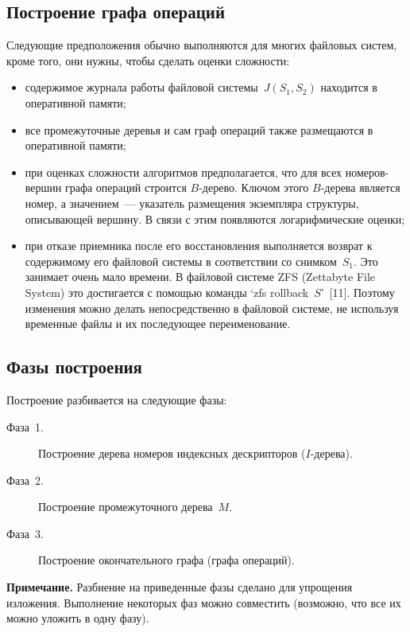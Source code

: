 \begin{multicols}{2}
\section{Построение графа операций}
\vspace*{-1pt}

      Следующие предположения обычно выполняются для многих файловых 
систем, кроме того, они нужны, чтобы сделать оценки сложности:  
      \begin{itemize}
\item содержимое журнала работы файловой системы~$J(S_1, S_2)$ 
находится в оперативной памяти;\\[-15pt]
\item все промежуточные деревья и сам граф операций также размещаются в 
оперативной памяти;\\[-15pt]
\item при оценках сложности алгоритмов предполагается, что для всех 
номеров-вершин графа операций строится $B$-дерево. Ключом этого 
$B$-дерева является номер, а значением~--- указатель размещения 
экземпляра структуры, описывающей вершину. В связи с этим появляются 
логарифмические оценки;\\[-15pt]
\item при отказе приемника после его восстановления выполняется возврат к 
содержимому его файловой системы в соответствии со снимком~$S_1$. Это 
занимает очень мало времени. В файловой системе ZFS (Zettabyte File System)
это достигается с 
помощью команды `zfs rollback~$S$'~[11]. Поэтому изменения можно 
делать непосредственно в файловой системе, не используя временные файлы 
и их последующее переименование.
\end{itemize}

\subsection{Фазы построения}

      Построение разбивается на следующие фазы:
      \begin{description}
\item[Фаза~1.] Построение дерева номеров индексных дескрипторов 
($I$-дерева).
\item[Фаза~2.] Построение промежуточного дерева~$M$.
\item[Фаза~3.] Построение окончательного графа (графа операций).
\end{description}

\smallskip

\noindent
{\sf \textbf{Примечание.} 
Разбиение на приведенные фазы сделано для 
упрощения изложения. Выполнение некоторых фаз можно совместить 
(возможно, что все их можно уложить в одну фазу).}


\end{multicols}
